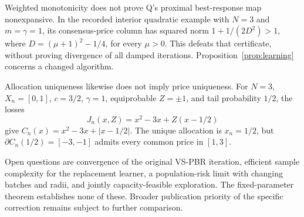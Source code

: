 \documentclass{article}
\begin{document}
Weighted monotonicity does not prove Q's proximal best-response map
nonexpansive. In the recorded interior quadratic example with \(N=3\)
and \(m=\gamma=1\), its consensus-price column has squared norm
\(1+1/(2D^2)>1\), where \(D=(\mu+1)^2-1/4\), for every \(\mu>0\).
This defeats that certificate, without proving divergence of all damped
iterations. Proposition~\ref{prop:learning} concerns a changed algorithm.

Allocation uniqueness likewise does not imply price uniqueness. For
\(N=3\), \(X_n=[0,1]\), \(c=3/2\), \(\gamma=1\), equiprobable
\(Z=\pm1\), and tail probability \(1/2\), the losses
\[
 J_n(x,Z)=x^2-3x+Z(x-1/2)
\]
give \(C_n(x)=x^2-3x+|x-1/2|\). The unique allocation is \(x_n=1/2\),
but \(\partial C_n(1/2)=[-3,-1]\) admits every common price in \([1,3]\).

Open questions are convergence of the original VS-PBR iteration, efficient
sample complexity for the replacement learner, a population-risk limit
with changing batches and radii, and jointly capacity-feasible exploration.
The fixed-parameter theorem establishes none of these. Broader publication
priority of the specific correction remains subject to further comparison.



\end{document}

